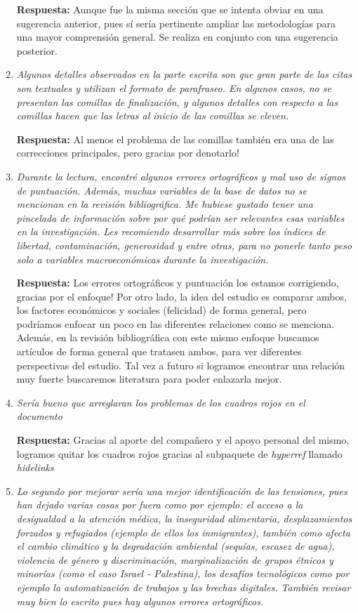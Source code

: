 \begin{enumerate}
    \textbf{Respuesta:} Aunque fue la misma sección que se intenta obviar en una sugerencia anterior, pues sí sería pertinente ampliar las metodologías para una mayor comprensión general. Se realiza en conjunto con una sugerencia posterior.
    
    \item \textit{Algunos detalles observados en la parte escrita son que gran parte de las citas son textuales y utilizan el formato de parafraseo. En algunos casos, no se presentan las comillas de finalización, y algunos detalles con respecto a las comillas hacen que las letras al inicio de las comillas se eleven.}

    \textbf{Respuesta:} Al menos el problema de las comillas también era una de las correcciones principales, pero gracias por denotarlo!  

    \item \textit{Durante la lectura, encontré algunos errores ortográficos y mal uso de signos de puntuación. Además, muchas variables de la base de datos no se mencionan en la revisión bibliográfica. Me hubiese gustado tener una pincelada de información sobre por qué podrían ser relevantes esas variables en la investigación. Les recomiendo desarrollar más sobre los índices de libertad, contaminación, generosidad y entre otras, para no ponerle tanto peso solo a variables macroeconómicas durante la investigación. }

    \textbf{Respuesta:} Los errores ortográficos y puntuación los estamos corrigiendo, gracias por el enfoque! Por otro lado, la idea del estudio es comparar ambos, los factores económicos y sociales (felicidad) de forma general, pero podríamos enfocar un poco en las diferentes relaciones como se menciona. Además, en la revisión bibliográfica con este mismo enfoque buscamos artículos de forma general que tratasen ambos, para ver diferentes perspectivas del estudio. Tal vez a futuro si logramos encontrar una relación muy fuerte buscaremos literatura para poder enlazarla mejor.

    \item \textit{Sería bueno que arreglaran los problemas de los cuadros rojos en el documento}

    \textbf{Respuesta: } Gracias al aporte del compañero y el apoyo personal del mismo, logramos quitar los cuadros rojos gracias al subpaquete de \textit{hyperref} llamado \textit{hidelinks}
    
    \item \textit{Lo segundo por mejorar sería una mejor identificación de las tensiones, pues han dejado varias cosas por fuera como por ejemplo: el acceso a la desigualdad a la atención médica, la inseguridad alimentaria, desplazamientos forzados y refugiados (ejemplo de ellos los inmigrantes), también como afecta el cambio climático y la degradación ambiental (sequías, escasez de agua), violencia de género y discriminación, marginalización de grupos étnicos y minorías (como el caso Israel - Palestina), los desafíos tecnológicos como por ejemplo la automatización de trabajos y las brechas digitales. También revisar muy bien lo escrito pues hay algunos errores ortográficos.}


\end{enumerate}

